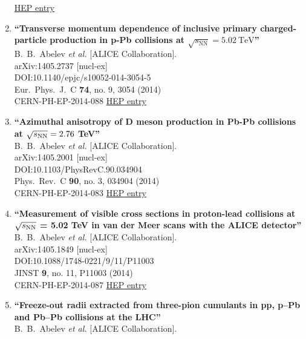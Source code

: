 \begin{enumerate}
\href{http://inspirehep.net/record/1296081}{HEP entry}
\item%
{\bf ``Transverse momentum dependence of inclusive primary charged-particle production in p-Pb collisions at $\sqrt{s_\mathrm{{NN}}}=5.02~\text {TeV}$''}
  \\{}B.~B.~Abelev {\it et al.} [ALICE Collaboration].
  \\{}arXiv:1405.2737 [nucl-ex]
  \\{}DOI:10.1140/epjc/s10052-014-3054-5
  \\{}Eur.\ Phys.\ J.\ C {\bf 74}, no. 9, 3054 (2014)
  \\{}CERN-PH-EP-2014-088
\href{http://inspirehep.net/record/1295687}{HEP entry}
\item%
{\bf ``Azimuthal anisotropy of D meson production in Pb-Pb collisions at $\sqrt{s_{\rm NN}} = 2.76$ TeV''}
  \\{}B.~B.~Abelev {\it et al.} [ALICE Collaboration].
  \\{}arXiv:1405.2001 [nucl-ex]
  \\{}DOI:10.1103/PhysRevC.90.034904
  \\{}Phys.\ Rev.\ C {\bf 90}, no. 3, 034904 (2014)
  \\{}CERN-PH-EP-2014-083
\href{http://inspirehep.net/record/1294938}{HEP entry}
\item%
{\bf ``Measurement of visible cross sections in proton-lead collisions at $\sqrt{s_{\rm NN}}$ = 5.02 TeV in van der Meer scans with the ALICE detector''}
  \\{}B.~B.~Abelev {\it et al.} [ALICE Collaboration].
  \\{}arXiv:1405.1849 [nucl-ex]
  \\{}DOI:10.1088/1748-0221/9/11/P11003
  \\{}JINST {\bf 9}, no. 11, P11003 (2014)
  \\{}CERN-PH-EP-2014-087
\href{http://inspirehep.net/record/1294934}{HEP entry}
\item%
{\bf ``Freeze-out radii extracted from three-pion cumulants in pp, p–Pb and Pb–Pb collisions at the LHC''}
  \\{}B.~B.~Abelev {\it et al.} [ALICE Collaboration].

\end{enumerate}
